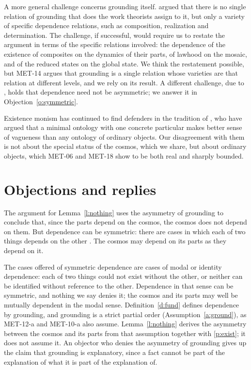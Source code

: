 \documentclass{situationist-preprint}
\begin{document}
A more general challenge concerns grounding itself. \citet{Wilson2014} argued that there is no single relation of grounding that does the work theorists assign to it, but only a variety of specific dependence relations, such as composition, realization and determination. The challenge, if successful, would require us to restate the argument in terms of the specific relations involved: the dependence of the existence of composites on the dynamics of their parts, of lawhood on the mosaic, and of the reduced states on the global state. We think the restatement possible, but MET-14 argues that grounding is a single relation whose varieties are that relation at different levels, and we rely on its result. A different challenge, due to \citet{Barnes2018}, holds that dependence need not be asymmetric; we answer it in Objection~\ref{o:symmetric}.

Existence monism has continued to find defenders in the tradition of \citet{HorganPotrc2008}, who have argued that a minimal ontology with one concrete particular makes better sense of vagueness than any ontology of ordinary objects. Our disagreement with them is not about the special status of the cosmos, which we share, but about ordinary objects, which MET-06 and MET-18 show to be both real and sharply bounded.

\section{Objections and replies}\label{s:objections}

\begin{objection}\label{o:symmetric}
The argument for Lemma~\ref{l:nothing} uses the asymmetry of grounding to conclude that, since the parts depend on the cosmos, the cosmos does not depend on them. But dependence can be symmetric: there are cases in which each of two things depends on the other \citep{Barnes2018}. The cosmos may depend on its parts as they depend on it.
\end{objection}

\begin{reply}
The cases offered of symmetric dependence are cases of modal or identity dependence: each of two things could not exist without the other, or neither can be identified without reference to the other. Dependence in that sense can be symmetric, and nothing we say denies it; the cosmos and its parts may well be mutually dependent in the modal sense. Definition~\ref{d:fund} defines dependence by grounding, and grounding is a strict partial order (Assumption~\ref{a:ground}), as MET-12-a and MET-10-a also assume. Lemma~\ref{l:nothing} derives the asymmetry between the cosmos and its parts from that assumption together with \ref{p:exist}; it does not assume it. An objector who denies the asymmetry of grounding gives up the claim that grounding is explanatory, since a fact cannot be part of the explanation of what it is part of the explanation of.
\end{reply}
\end{document}
